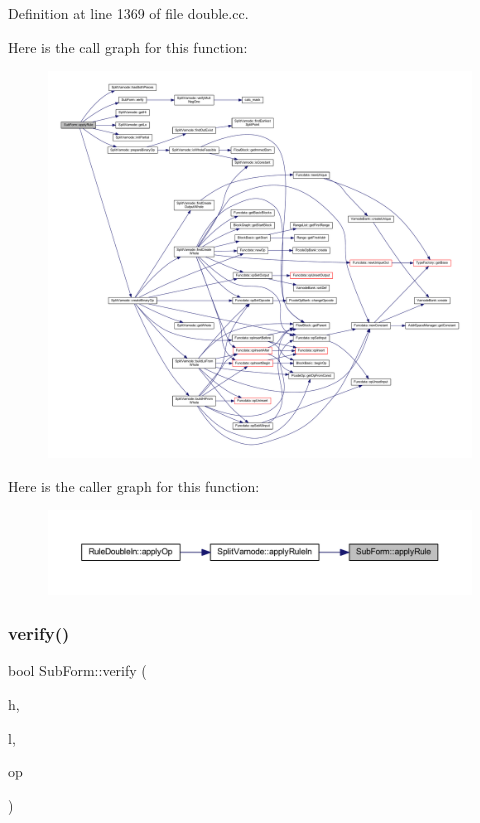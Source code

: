 Definition at line 1369 of file double.\+cc.

Here is the call graph for this function\+:
\nopagebreak
\begin{figure}[H]
\begin{center}
\leavevmode
\includegraphics[width=350pt]{class_sub_form_a63a1ea611a21bbd987ad99ce18c8e478_cgraph}
\end{center}
\end{figure}
Here is the caller graph for this function\+:
\nopagebreak
\begin{figure}[H]
\begin{center}
\leavevmode
\includegraphics[width=350pt]{class_sub_form_a63a1ea611a21bbd987ad99ce18c8e478_icgraph}
\end{center}
\end{figure}
\mbox{\label{class_sub_form_a9c6777b111bd5112862b798818ad2250}} 
\subsubsection{\texorpdfstring{verify()}{verify()}}
{\footnotesize\ttfamily bool Sub\+Form\+::verify (\begin{DoxyParamCaption}\item[{\mbox{\hyperlink{class_varnode}{Varnode}} $\ast$}]{h,  }\item[{\mbox{\hyperlink{class_varnode}{Varnode}} $\ast$}]{l,  }\item[{\mbox{\hyperlink{class_pcode_op}{Pcode\+Op}} $\ast$}]{op }\end{DoxyParamCaption})}



